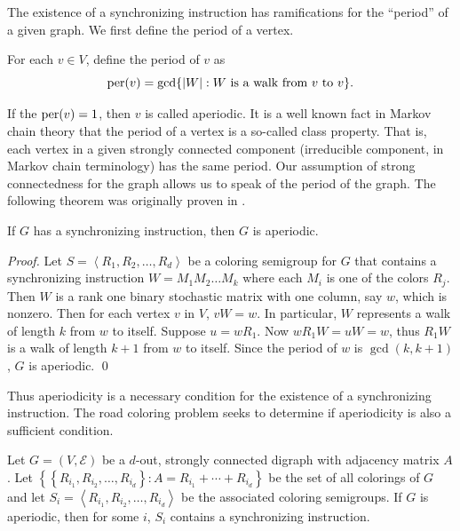The existence of a synchronizing instruction has ramifications for the
``period'' of a given graph. We first define the period 
of a vertex. 

\begin{definition}		\label{defn:4.2}
For each $v \in V$, define the period of $v$ as 
\[
  \operatorname{per}(v)=\operatorname{gcd}\{|W|:W\text{ is a walk from }v\text{ to }v\}.
\]

If the $\operatorname{per}(v) = 1$, then $v$ is called aperiodic. 
It is a well known fact in Markov chain theory that the period of a vertex 
is a so-called class property. 
That is, each vertex in a given strongly connected component (irreducible component, in Markov chain terminology) has the same period. 
Our assumption of strong connectedness for the graph allows us to speak 
of the period of the graph. 
The following theorem was originally proven in
\cite{AGW}.
\end{definition}

\begin{theorem}		\label{thm:4.3}
If $G$ has a synchronizing instruction, then $G$ is aperiodic.
\end{theorem}

\begin{proof}
Let $S=\left\langle R_1,R_2,\dots,R_d\right\rangle$ be a coloring semigroup
for $G$ that contains a synchronizing instruction $W=M_1M_2\dots M_k$ where each $M_i$ is one of the colors $R_j$. 
Then $W$ is a rank one binary stochastic matrix with one column,  say $w$, which is nonzero. 
Then for each vertex $v$ in $V$, $vW=w$. 
In particular, $W$ represents a walk of length $k$ from $w$ to itself. Suppose $u=wR_1$.
Now  $wR_1W= uW = w$, thus $R_1W$ is a walk of length $k+1$ from $w$ to itself. Since the period of $w$ is $\gcd(k,k+1)$, $G$ is aperiodic.
\qed
\end{proof}

Thus aperiodicity is a necessary condition for the existence of a synchronizing instruction. 
The road coloring problem seeks to determine if aperiodicity is also a sufficient condition.

Let $G=(V,\mathcal{E})$ be a $d$-out, strongly connected digraph with adjacency matrix $A$. 
Let $\left\{\left\{R_{i_1},R_{i_2},\dots,R_{i_d}\right\}:A=R_{i_1}+\cdots
+R_{i_d}\right\}$ be the set of all colorings of $G$ and let $S_i=\left\langle R_{i_1},R_{i_2},\dots,R_{i_d}\right\rangle$ be the associated coloring semigroups. 
If $G$ is aperiodic, then for some $i$, $S_i$ contains a synchronizing instruction.
